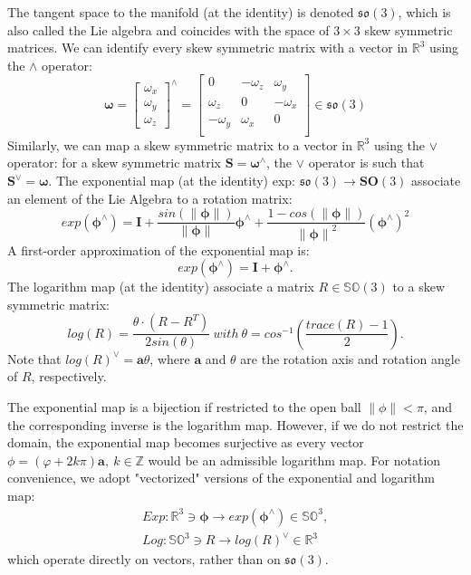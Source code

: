 \documentclass[a4paper,12pt]{report}
\begin{document}
The tangent space to the manifold (at the identity) is denoted $\mathfrak{so}(3)$, which is also called the Lie algebra and coincides with the space of $3 \times 3$ skew symmetric matrices. We can identify every skew symmetric matrix with a vector in $\mathbb{R}^3$ using the $\land$ operator:
\begin{equation}
\bm{\omega}=
\left[
\begin{matrix}
{\omega}_x \\ 
{\omega}_y \\ 
{\omega}_z
\end{matrix}
\right]^{\land}
=\left[
\begin{matrix}
0 & -\omega_z & \omega_y \\
\omega_z & 0 & -\omega_x \\ 
-\omega_y & \omega_x & 0 \\
\end{matrix}
\right]
\in \mathfrak{so}(3)
\end{equation}
Similarly, we can map a skew symmetric matrix to a vector in $\mathbb{R}^3$ using the $\vee$ operator: for a skew symmetric matrix $\mathbf{S}=\bm{\omega}^{\land}$, the $\vee$ operator is such that $\mathbf{S}^{\vee}=\bm{\omega}$. The exponential map (at the identity) exp: $\mathfrak{so}(3) \to \mathbf{SO}(3)$ associate an element of the Lie Algebra to a rotation matrix:
\begin{equation}
exp(\bm{\phi}^{\land})=
\bm{I}+\frac{sin(\parallel \bm{\phi} \parallel)}{\parallel \bm{\phi} \parallel}\bm{\phi}^{\land}+\frac{1-cos(\parallel \bm{\phi} \parallel)}{{\parallel \bm{\phi} \parallel}^2
}(\bm{\phi^{\land}})^{2} 
\end{equation}
A first-order approximation of the exponential map is:
\begin{equation}
exp(\bm{\phi}^{\land})=\bm{I}+\bm{{\phi}^{\land}}.
\end{equation}
The logarithm map (at the identity) associate a matrix $R \in \mathbb{SO}(3)$ to a skew symmetric matrix:
\begin{equation}
log(R)=\frac{\theta \cdot (R-R^T)}{2sin(\theta)}\ with\ \theta=cos^{-1}(\frac{trace(R)-1}{2}).
\end{equation}
Note that $log(R)^\vee = \bm{a}\theta$, where $\bm{a}$ and $\theta$ are the rotation axis and rotation angle of $R$, respectively.

The exponential map is a bijection if restricted to the open ball $\parallel\phi\parallel < \pi$, and the corresponding inverse is the logarithm map. However, if we do not restrict the domain, the exponential map becomes surjective as every vector $\phi = (\varphi+2k\pi)\bm{a},\ k \in \mathbb{Z}$ would be an admissible logarithm map.
For notation convenience, we adopt "vectorized" versions of the exponential and logarithm map:
\begin{equation}
\left.
\begin{matrix}
Exp: \mathbb{R}^3 \ni \bm{\phi} \to exp(\bm{\phi}^{\land}) \in \mathbb{SO}^3, \\
Log: \mathbb{SO}^3 \ni R \to log(R)^{\vee} \in \mathbb{R}^3
\end{matrix}
\right.
\end{equation}
which operate directly on vectors, rather than on $\mathfrak{so}(3)$.
\end{document}
